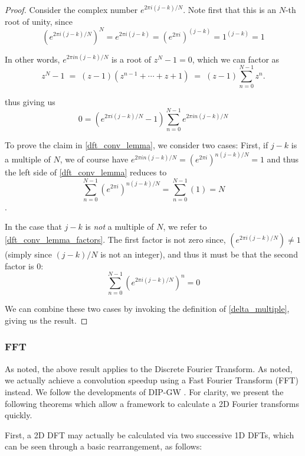 	\begin{proof}
	
	Consider the complex number $e^{2\pi i (j-k)/N}$. Note first that this is an $N$-th root of unity, since
	\[
	\left(e^{2\pi i (j-k)/N}\right)^N = e^{2\pi i (j-k)} = \left(e^{2\pi i}\right)^{(j-k)}
	= 1^{(j-k)} = 1
	\]

In other words, $e^{2\pi i n(j-k)/N}$ is a root of $z^N -1 = 0$, which we can factor as
\begin{equation}
z^N -1 \;=\; (z-1)\left(z^{n-1} + \cdots + z + 1\right) \;=\; (z-1)\sum_{n=0}^{N-1} z^n .
\end{equation}

thus giving us
\begin{equation} \label{dft_conv_lemma_factors}
0 = \left(e^{2\pi i(j-k)/N} - 1\right) \sum_{n=0}^{N-1} e^{2\pi i n(j-k)/N}
\end{equation}

To prove the claim in \cref{dft_conv_lemma}, we consider two cases: First, if $j-k$ is a multiple of $N$, we of course have $e^{2\pi i n(j-k)/N} = \left(e^{2\pi i}\right)^{n(j-k)/N} = 1$  and thus the left side of \cref{dft_conv_lemma} reduces to 
\[
\sum_{n=0}^{N-1} \left(e^{2\pi i}\right)^{n(j-k)/N} = \sum_{n=0}^{N-1} \left(1\right) = N
\].

In the case that $j-k$ is \textit{not} a multiple of $N$, we refer to \cref{dft_conv_lemma_factors}.
The first factor is not zero since, $\left(e^{2\pi i (j-k)/N}\right) \ne 1$ (simply since $(j-k)/N$ is not an integer), and thus it must be that the second factor is 0:
\[
\sum_{n=0}^{N-1} \left(e^{2\pi i (j-k)/N}\right)^n = 0\]

We can combine these two cases by invoking the definition of \cref{delta_multiple}, giving us the result.
	\end{proof}
			
	\subsubsection{FFT}
	As noted, the above result applies to the Discrete Fourier Transform. As noted, we actually achieve a convolution speedup using a Fast Fourier Transform (FFT) instead. We follow the developments of DIP-GW . For clarity, we present the following theorems which allow a framework to calculate a 2D Fourier transforms quickly.
	
	
	First, a 2D DFT may actually be calculated via two successive 1D DFTs, which can be
	seen through a basic rearrangement, as follows:
	
